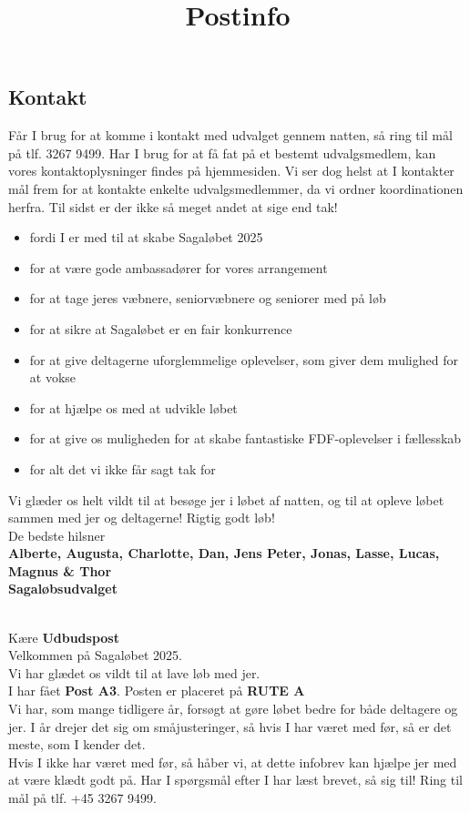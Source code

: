 \subsection{Kontakt}
Får I brug for at komme i kontakt med udvalget gennem natten, så ring til mål på tlf. 3267 9499. Har I brug for at få fat på et bestemt udvalgsmedlem, kan vores kontaktoplysninger findes på hjemmesiden. Vi ser dog helst at I kontakter mål frem for at kontakte enkelte udvalgsmedlemmer, da vi ordner koordinationen herfra.
\newline
Til sidst er der ikke så meget andet at sige end tak!\begin{itemize}
  \item fordi I er med til at skabe Sagaløbet 2025
  \item for at være gode ambassadører for vores arrangement
  \item for at tage jeres væbnere, seniorvæbnere og seniorer med på løb
  \item for at sikre at Sagaløbet er en fair konkurrence
  \item for at give deltagerne uforglemmelige oplevelser, som giver dem mulighed for at vokse
  \item for at hjælpe os med at udvikle løbet
  \item for at give os muligheden for at skabe fantastiske FDF-oplevelser i fællesskab
  \item for alt det vi ikke får sagt tak for
\end{itemize}
Vi glæder os helt vildt til at besøge jer i løbet af natten, og til at opleve løbet sammen med jer og deltagerne!
\newline
Rigtig godt løb!\\
\newline
\textcolor{søblå}{De bedste hilsner}\\
\textcolor{natblå}{\textbf{Alberte, Augusta, Charlotte, Dan, Jens Peter, Jonas, Lasse, Lucas, Magnus \& Thor}}\\
\textcolor{natblå}{\textbf{Sagaløbsudvalget}}\\
\newpage
\title{Postinfo}\\
Kære \textbf{Udbudspost}\\
\newline
Velkommen på Sagaløbet 2025.\\
Vi har glædet os vildt til at lave løb med jer.\\
\newline
I har fået \textbf{Post A3}. Posten er placeret på \textbf{RUTE A}\\
Vi har, som mange tidligere år, forsøgt at gøre løbet bedre for både deltagere og jer. I år drejer det sig om småjusteringer, så hvis I har været med før, så er det meste, som I kender det.\\
\newline
Hvis I ikke har været med før, så håber vi, at dette infobrev kan hjælpe jer med at være klædt godt på. Har I spørgsmål efter I har læst brevet, så sig til! Ring til mål på tlf. +45 3267 9499.
